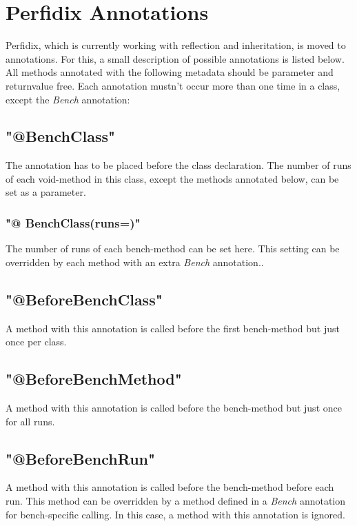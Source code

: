 \documentclass[12pt]{article}
\begin{document}
\section{Perfidix Annotations}
Perfidix, which is currently working with reflection and inheritation, is moved to annotations.
For this, a small description of possible annotations is listed below. All methods annotated with the following metadata should be parameter and returnvalue free. Each annotation mustn't occur more than one time in a class, except the \emph{Bench} annotation:
\subsection{"@BenchClass"}
The annotation has to be placed before the class declaration. The number of runs of each void-method in this class, except the methods annotated below, can be set as a parameter.
\subsubsection{"@ BenchClass(runs=)"}
The number of runs of each bench-method can be set here. This setting can be overridden by each method with an extra \emph{Bench} annotation..
\subsection{"@BeforeBenchClass"}
A method with this annotation is called before the first bench-method but just once per class.
\subsection{"@BeforeBenchMethod"}
A method with this annotation is called before the bench-method but just once for all runs.
\subsection{"@BeforeBenchRun"}
A method with this annotation is called before the bench-method before each run. This method can be overridden by a method defined in a   \emph{Bench} annotation for bench-specific calling. In this case, a method with this annotation is ignored.
\end{document}
